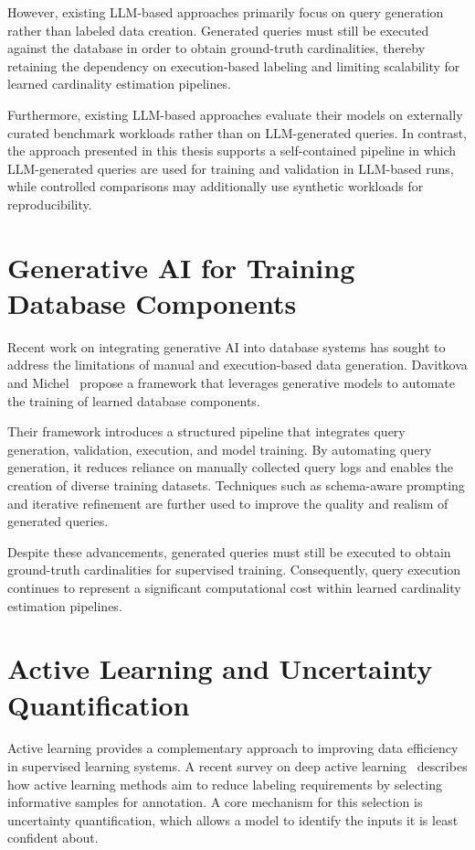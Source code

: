 However, existing LLM-based approaches primarily focus on query generation rather than labeled data creation. Generated queries must still be executed against the database in order to obtain ground-truth cardinalities, thereby retaining the dependency on execution-based labeling and limiting scalability for learned cardinality estimation pipelines.

Furthermore, existing LLM-based approaches evaluate their models on externally curated benchmark workloads rather than on LLM-generated queries. In contrast, the approach presented in this thesis supports a self-contained pipeline in which LLM-generated queries are used for training and validation in LLM-based runs, while controlled comparisons may additionally use synthetic workloads for reproducibility.

\section{Generative AI for Training Database Components}

Recent work on integrating generative AI into database systems has sought to address the limitations of manual and execution-based data generation. Davitkova and Michel~\cite{DBLP:journals/corr/abs-2512-20271} propose a framework that leverages generative models to automate the training of learned database components.

Their framework introduces a structured pipeline that integrates query generation, validation, execution, and model training. By automating query generation, it reduces reliance on manually collected query logs and enables the creation of diverse training datasets. Techniques such as schema-aware prompting and iterative refinement are further used to improve the quality and realism of generated queries.

Despite these advancements, generated queries must still be executed to obtain ground-truth cardinalities for supervised training. Consequently, query execution continues to represent a significant computational cost within learned cardinality estimation pipelines.

\section{Active Learning and Uncertainty Quantification}

Active learning provides a complementary approach to improving data efficiency in supervised learning systems. A recent survey on deep active learning~\cite{DBLP:journals/tnn/LiWCJDO25} describes how active learning methods aim to reduce labeling requirements by selecting informative samples for annotation. A core mechanism for this selection is uncertainty quantification, which allows a model to identify the inputs it is least confident about.

